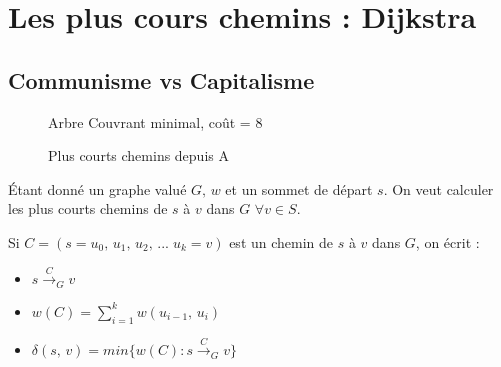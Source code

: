 \chapter{Les plus cours chemins : Dijkstra}

\section*{Communisme vs Capitalisme}
\begin{figure}[h]
\centering
\begin{minipage}{.5\textwidth}
  \centering
  \caption{Arbre Couvrant minimal, coût = $8$}
\end{minipage}%
\begin{minipage}{.5\textwidth}
  \centering
  \caption{Plus courts chemins depuis A}
\end{minipage}%
\end{figure}

Étant donné un graphe valué $G,\, w$ et un sommet de départ $s$. On veut calculer les plus courts chemins de $s$ à $v$ dans $G$ $\forall v \in S$.

\begin{definition}[Notations]
Si $C = (s = u_{0},\, u_{1},\, u_{2},\, ...\; u_{k} = v)$ est un chemin de $s$ à $v$ dans $G$, on écrit :

\begin{itemize}
\item $s \overset{C}{\longrightarrow}_{G} v$
\item $w(C) = \sum\limits_{i = 1}^{k} w (u_{i-1},\, u_{i})$
\item $\delta (s,\, v) = min \lbrace w (C) : s \overset{C}{\longrightarrow}_{G} v\rbrace$
\end{itemize}
\end{definition}

